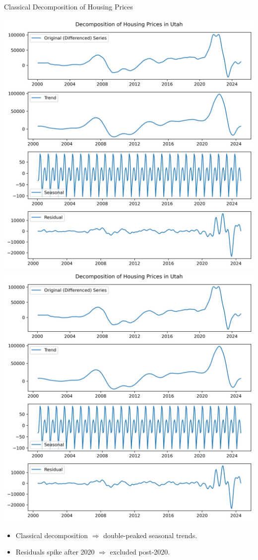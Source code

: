\documentclass{beamer}
\begin{document}
\begin{frame}{Classical Decomposition of Housing Prices} 
\begin{center}
  \includegraphics[width=0.45\linewidth,trim={0 3.8in 0 0.3in},clip]{figures/utah_prices.png}
  \includegraphics[width=0.45\linewidth,trim={0 0 0 4.1in},clip]{figures/utah_prices.png}
\end{center}
  \begin{itemize}%
    \item Classical decomposition $\Rightarrow$ double-peaked seasonal trends.
    \item Residuals spike after 2020 $\Rightarrow$ excluded post-2020.
  \end{itemize}
\end{frame}
\end{document}
